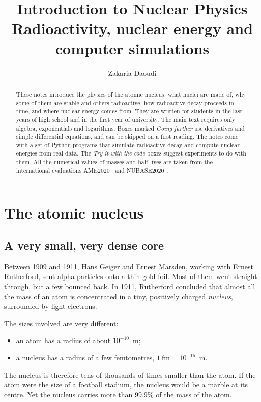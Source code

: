 \documentclass[11pt,a4paper]{article}
\title{\textbf{Introduction to Nuclear Physics}\\[4pt]
\large Radioactivity, nuclear energy and computer simulations}
\author{Zakaria Daoudi}
\date{}
\begin{document}
\maketitle
\thispagestyle{empty}

\begin{abstract}
\noindent These notes introduce the physics of the atomic nucleus: what nuclei are made of, why some of them are stable and others radioactive, how radioactive decay proceeds in time, and where nuclear energy comes from. They are written for students in the last years of high school and in the first year of university. The main text requires only algebra, exponentials and logarithms. Boxes marked \emph{Going further} use derivatives and simple differential equations, and can be skipped on a first reading. The notes come with a set of Python programs that simulate radioactive decay and compute nuclear energies from real data. The \emph{Try it with the code} boxes suggest experiments to do with them. All the numerical values of masses and half-lives are taken from the international evaluations AME2020~\cite{AME2020} and NUBASE2020~\cite{NUBASE2020}.
\end{abstract}

\setcounter{tocdepth}{1}
\tableofcontents
\newpage

\section{The atomic nucleus}

\subsection{A very small, very dense core}

Between 1909 and 1911, Hans Geiger and Ernest Marsden, working with Ernest Rutherford, sent alpha particles onto a thin gold foil. Most of them went straight through, but a few bounced back. In 1911, Rutherford concluded that almost all the mass of an atom is concentrated in a tiny, positively charged \emph{nucleus}, surrounded by light electrons.

The sizes involved are very different:
\begin{itemize}
  \item an atom has a radius of about $10^{-10}$~m;
  \item a nucleus has a radius of a few femtometres, $1~\text{fm} = 10^{-15}$~m.
\end{itemize}
The nucleus is therefore tens of thousands of times smaller than the atom. If the atom were the size of a football stadium, the nucleus would be a marble at its centre. Yet the nucleus carries more than $99.9\%$ of the mass of the atom.
\end{document}
